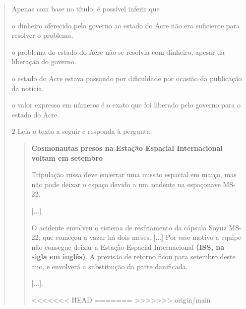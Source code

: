 \begin{quote}
Apenas com base no título, é possível inferir que

\begin{escolha}
\item o dinheiro oferecido pelo governo ao estado do Acre não era suficiente para resolver o problema.

\item o problema do estado do Acre não se resolvia com dinheiro, apesar da liberação do governo.

\item o estado do Acre estava passando por dificuldade por ocasião da publicação da notícia.

\item o valor expresso em números é o exato que foi liberado pelo governo para o estado do Acre.
\end{escolha}


\num{2} Leia o texto a seguir e responda à pergunta:

\begin{quote}
\textbf{Cosmonautas presos na Estação Espacial Internacional voltam em
setembro}

Tripulação russa deve encerrar uma missão espacial em março, mas não
pode deixar o espaço devido a um acidente na espaçonave MS-22.

{[}...{]}

O acidente envolveu o sistema de resfriamento da cápsula Soyuz MS-22,
que começou a vazar há dois meses. {[}...{]} Por esse motivo a equipe
não consegue deixar a Estação Espacial Internacional \textbf{(ISS, na
sigla em inglês)}. A previsão de retorno ficou para setembro deste ano,
e envolverá a substituição da parte danificada.

{[}...{]}.

<<<<<<< HEAD
=======
>>>>>>> origin/main
\end{quote}


\end{quote}
